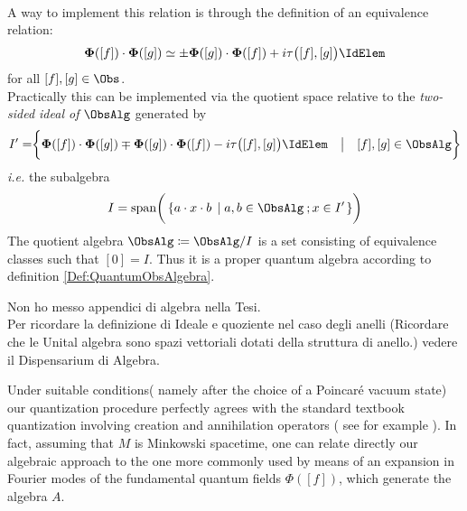 \documentclass[Main]{subfiles}
\begin{document}
				\\
   		 		A way to implement this relation is through the definition of an equivalence relation:
   		 			\begin{equation}\label{Eq:EquiClass}
   		 				\mathbf{\Phi}([f]) \cdot \mathbf{\Phi}([g]) \simeq \pm \mathbf{\Phi}([g]) \cdot \mathbf{\Phi}([f]) +
   		 				i \tau\big( [f], [g] \big) \IdElem
   		 			\end{equation}
   		 		for all $[f],[g] \in \Obs$.\\
   		 		Practically this can be implemented via the quotient space relative to the \emph{two-sided ideal of} $\ObsAlg$ generated by
   		 		\begin{displaymath}
	 					I'= \biggr\{
   		 					 \mathbf{\Phi}([f]) \cdot \mathbf{\Phi}([g])  \mp \mathbf{\Phi}([g]) \cdot \mathbf{\Phi}([f]) -
   		 				i \tau\big( [f], [g] \big)\IdElem \quad \big \vert \quad [f],[g]\in \ObsAlg
   		 					 \biggr\}
   		 		\end{displaymath}
   		 		\textit{i.e.} the subalgebra
   		 		\begin{displaymath}
   		 			I= \textrm{span} \biggr( \left\lbrace a \cdot x \cdot b\; \left\vert\;  a,b \in \ObsAlg \: ; x \in I'\right. \right\rbrace \biggr)
   		 		\end{displaymath}
   		 		The quotient algebra $\mathbf{\ObsAlg} \coloneqq \ObsAlg / I$ is a set consisting of equivalence classes  such that $[0] = I$.
   		 		Thus it is a proper quantum algebra according to definition \ref{Def:QuantumObsAlgebra}.

\ifToninus
	\begin{Warning}
		Non ho messo appendici di algebra nella Tesi. \\
		Per ricordare la definizione di Ideale e quoziente nel caso degli anelli (Ricordare che le Unital algebra sono spazi vettoriali dotati della struttura di anello.) vedere il Dispensarium di Algebra.
	\end{Warning}
\fi

			\begin{remark}
			Under suitable conditions( namely after the choice of a Poincaré vacuum state) our quantization procedure perfectly agrees with the standard textbook quantization involving creation and annihilation operators ( see for example \cite{Mandl2013}).
			In fact, assuming that $M$ is Minkowski spacetime, one can relate directly our algebraic approach to the one more commonly used by means of an expansion in Fourier modes of the fundamental quantum fields $\Phi([ f ])$, which generate the algebra $A$.
			\end{remark}
\end{document}
